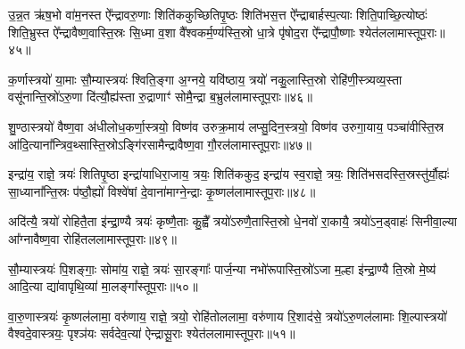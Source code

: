 {\anuvakamend[{॥13॥}]}

उ॒न्न॒त ऋ॑ष॒भो वा॑म॒नस्त ऐ᳚न्द्रावरु॒णाः शिति॑ककुच्छितिपृ॒ष्ठः शिति॑भस॒त्त ऐ᳚न्द्राबार्\mbox{}हस्प॒त्याः शिति॒पाच्छि॒त्योष्ठः॑ शिति॒भ्रुस्त ऐ᳚न्द्रावैष्ण॒वास्ति॒स्रः सि॒ध्मा व॒शा वै᳚श्वकर्म॒ण्य॑स्ति॒स्रो धा॒त्रे पृ॑षोद॒रा ऐ᳚न्द्रापौ॒ष्णाः श्येत॑ललामास्तूप॒राः॥४५॥

{}

क॒र्णास्त्रयो॑ या॒माः सौ॒म्यास्त्रयः॑ श्विति॒ङ्गा अ॒ग्नये॒ यवि॑ष्ठाय॒ त्रयो॑ नकु॒लास्ति॒स्रो रोहि॑णी॒स्त्र्यव्य॒स्ता वसू॑नान्ति॒स्रो॑\-ऽरु॒णा दि॑त्यौ॒ह्य॑स्ता रु॒द्राणाꣳ॑ सोमै॒न्द्रा ब॒भ्रुल॑लामास्तूप॒राः॥४६॥

{\anuvakamend[{क॒र्णास्त्रयो॑विꣳशतिः॥15॥}]}

शु॒ण्ठास्त्रयो॑ वैष्ण॒वा अ॑धीलोध॒कर्णा॒स्त्रयो॒ विष्ण॑व उरुक्र॒माय॑ लप्सु॒दिन॒स्त्रयो॒ विष्ण॑व उरुगा॒याय॒ पञ्चा॑वीस्ति॒स्र आ॑दि॒त्याना᳚न्त्रिव॒थ्सास्ति॒स्रो\-ऽङ्गि॑रसामैन्द्रावैष्ण॒वा गौ॒रल॑लामास्तूप॒राः॥४७॥

{\anuvakamend[{शु॒ण्ठा विꣳ॑श॒तिः॥16॥}]}

इन्द्रा॑य॒ राज्ञे॒ त्रयः॑ शितिपृ॒ष्ठा इन्द्रा॑याधिरा॒जाय॒ त्रयः॒ शिति॑ककुद॒ इन्द्रा॑य स्व॒राज्ञे॒ त्रयः॒ शिति॑भसदस्ति॒स्रस्तु॑र्यौ॒ह्यः॑ सा॒ध्याना᳚न्ति॒स्रः प॑ष्ठौ॒ह्यो॑ विश्वे॑षां दे॒वाना॑माग्ने॒न्द्राः कृ॒ष्णल॑लामास्तूप॒राः॥४८॥

{\anuvakamend[{इन्द्रा॑य॒ राज्ञे॒ द्वाविꣳ॑शतिः॥17॥}]}

अदि॑त्यै॒ त्रयो॑ रोहितै॒ता इ॑न्द्रा॒ण्यै त्रयः॑ कृष्णै॒ताः कु॒ह्वै᳚ त्रयो॑\-ऽरुणै॒तास्ति॒स्रो धे॒नवो॑ रा॒कायै॒ त्रयो॑\-ऽन॒ड्वाहः॑ सिनीवा॒ल्या आ᳚ग्नावैष्ण॒वा रोहि॑तललामास्तूप॒राः॥४९॥

{\anuvakamend[{अदि॑त्या अ॒ष्टाद॑श॥18॥}]}

सौ॒म्यास्त्रयः॑ पि॒शङ्गाः॒ सोमा॑य॒ राज्ञे॒ त्रयः॑ सा॒रङ्गाः᳚ पार्ज॒न्या नभो॑रूपास्ति॒स्रो॑\-ऽजा म॒ल्\mbox{}हा इ॑न्द्रा॒ण्यै ति॒स्रो मे॒ष्य॑ आदि॒त्या द्या॑वापृथि॒व्या॑ मा॒लङ्गा᳚स्तूप॒राः॥५०॥

{\anuvakamend[{सौ॒म्या एका॒न्नविꣳ॑शतिः॥19॥}]}

वा॒रु॒णास्त्रयः॑ कृ॒ष्णल॑लामा॒ वरु॑णाय॒ राज्ञे॒ त्रयो॒ रोहि॑तोललामा॒ वरु॑णाय रि॒शाद॑से॒ त्रयो॑\-ऽरु॒णल॑लामाः शि॒ल्पास्त्रयो॑ वैश्वदे॒वास्त्रयः॒ पृश्ञ॑यः सर्वदेव॒त्या॑ ऐन्द्रासू॒राः श्येत॑ललामास्तूप॒राः॥५१॥

{\anuvakamend[{वा॒रु॒णा विꣳ॑श॒तिः॥20॥}]}

